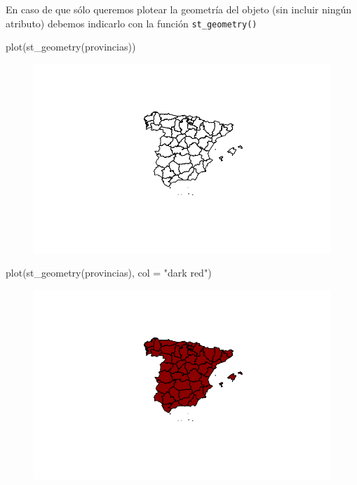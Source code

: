 \documentclass[
  letterpaper,
  DIV=11,
  numbers=noendperiod]{scrreprt}
\newenvironment{Shaded}{\begin{snugshade}}{\end{snugshade}}
\newcommand{\AttributeTok}[1]{\textcolor[rgb]{0.40,0.45,0.13}{#1}}
\newcommand{\FunctionTok}[1]{\textcolor[rgb]{0.28,0.35,0.67}{#1}}
\newcommand{\NormalTok}[1]{\textcolor[rgb]{0.00,0.23,0.31}{#1}}
\newcommand{\StringTok}[1]{\textcolor[rgb]{0.13,0.47,0.30}{#1}}
\begin{document}
En caso de que sólo queremos plotear la geometría del objeto (sin
incluir ningún atributo) debemos indicarlo con la función
\texttt{st\_geometry()}

\begin{Shaded}
\begin{Highlighting}[]
\FunctionTok{plot}\NormalTok{(}\FunctionTok{st\_geometry}\NormalTok{(provincias))}
\end{Highlighting}
\end{Shaded}

\begin{figure}[H]

{\centering \includegraphics{03_DatosEspaciales_files/figure-pdf/unnamed-chunk-10-1.pdf}

}

\end{figure}

\begin{Shaded}
\begin{Highlighting}[]
\FunctionTok{plot}\NormalTok{(}\FunctionTok{st\_geometry}\NormalTok{(provincias), }\AttributeTok{col =} \StringTok{"dark red"}\NormalTok{)}
\end{Highlighting}
\end{Shaded}

\begin{figure}[H]

{\centering \includegraphics{03_DatosEspaciales_files/figure-pdf/unnamed-chunk-11-1.pdf}

}

\end{figure}
\end{document}
